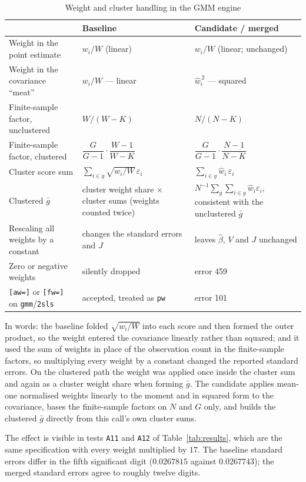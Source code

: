 \documentclass[11pt]{article}
\newcommand{\code}[1]{\texttt{\small #1}}
\begin{document}
\begin{table}[h]
\centering
\caption{Weight and cluster handling in the GMM engine}
\label{tab:weights}
\renewcommand{\arraystretch}{1.25}
\begin{tabular}{p{} p{} p{}}
\toprule
 & Baseline & Candidate / merged \\
\midrule
Weight in the point estimate & $w_i/W$ (linear) & $w_i/W$ (linear; unchanged) \\
Weight in the covariance ``meat'' & $w_i/W$ --- linear & $\hat{w}_i^{\,2}$ --- squared \\
Finite-sample factor, unclustered & $W/(W-K)$ & $N/(N-K)$ \\
Finite-sample factor, clustered & $\dfrac{G}{G-1}\cdot\dfrac{W-1}{W-K}$ & $\dfrac{G}{G-1}\cdot\dfrac{N-1}{N-K}$ \\
Cluster score sum & $\sum_{i \in g}\sqrt{w_i/W}\,\varepsilon_i$ & $\sum_{i \in g}\hat{w}_i\,\varepsilon_i$ \\
Clustered $\bar{g}$ & cluster weight share $\times$ cluster sums (weights counted twice) & $N^{-1}\sum_g\sum_{i \in g}\hat{w}_i\varepsilon_i$, consistent with the unclustered $\bar{g}$ \\
Rescaling all weights by a constant & changes the standard errors and $J$ & leaves $\hat{\beta}$, $V$ and $J$ unchanged \\
Zero or negative weights & silently dropped & error 459 \\
\code{[aw=]} or \code{[fw=]} on \code{gmm}/\code{2sls} & accepted, treated as \code{pw} & error 101 \\
\bottomrule
\end{tabular}
\end{table}

\noindent In words: the baseline folded $\sqrt{w_i/W}$ into each score and then formed the
outer product, so the weight entered the covariance linearly rather than squared; and it
used the sum of weights in place of the observation count in the finite-sample factors,
so multiplying every weight by a constant changed the reported standard errors. On the
clustered path the weight was applied once inside the cluster sum and again as a cluster
weight share when forming $\bar{g}$. The candidate applies mean-one normalised weights
linearly to the moment and in squared form to the covariance, bases the finite-sample
factors on $N$ and $G$ only, and builds the clustered $\bar{g}$ directly from this call's
own cluster sums.

\noindent The effect is visible in tests \code{A11} and \code{A12} of
Table~\ref{tab:results}, which are the same specification with every weight multiplied by
$17$. The baseline standard errors differ in the fifth significant digit
($0.0267815$ against $0.0267743$); the merged standard errors agree to roughly twelve
digits.
\end{document}
